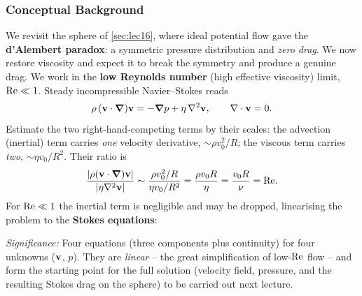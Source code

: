 \documentclass[../main.tex]{subfiles}
\begin{document}
\subsubsection*{Conceptual Background}
We revisit the sphere of \cref{sec:lec16}, where ideal potential flow gave the \textbf{d'Alembert paradox}: a symmetric pressure distribution and \emph{zero drag}. We now restore viscosity and expect it to break the symmetry and produce a genuine drag. We work in the \textbf{low Reynolds number} (high effective viscosity) limit, $\mathrm{Re}\ll1$. Steady incompressible Navier--Stokes reads
\begin{equation}
  \rho\,(\mathbf{v}\cdot\grad)\mathbf{v}=-\grad p+\eta\,\nabla^2\mathbf{v} ,\qquad \nabla \cdot\mathbf{v}=0 .
  \label{eq:lec20_NS_sphere}
\end{equation}
Estimate the two right-hand-competing terms by their scales: the advection (inertial) term carries \emph{one} velocity derivative, $\sim \rho v_0^2/R$; the viscous term carries \emph{two}, $\sim \eta v_0/R^2$. Their ratio is
\begin{equation}
  \frac{|\rho(\mathbf{v}\cdot\grad)\mathbf{v}|}{|\eta\nabla^2\mathbf{v}|}
  \sim\frac{\rho v_0^2/R}{\eta v_0/R^2}
  =\frac{\rho v_0 R}{\eta}=\frac{v_0 R}{\nu}=\mathrm{Re} .
  \label{eq:lec20_estimate}
\end{equation}
For $\mathrm{Re}\ll1$ the inertial term is negligible and may be dropped, linearising the problem to the \textbf{Stokes equations}:

\textit{Significance:} Four equations (three components plus continuity) for four unknowns ($\mathbf{v}$, $p$). They are \emph{linear} -- the great simplification of low-$\mathrm{Re}$ flow -- and form the starting point for the full solution (velocity field, pressure, and the resulting Stokes drag on the sphere) to be carried out next lecture.

\end{document}
